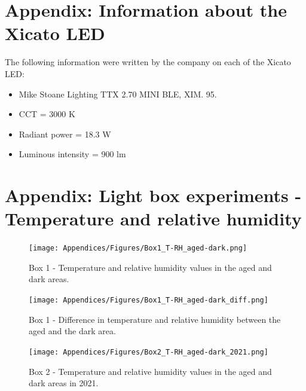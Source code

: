 \begin{appendices}
  
\renewcommand{\thesection}{4.\arabic{section}}



\newpage
\section[\hspace{0.3cm}Information about the Xicato LED]{ Appendix: Information about the Xicato LED}
\label{app:ch4_xicato_LED}

The following information were written by the company on each of the Xicato LED:
\begin{itemize}
\item Mike Stoane Lighting TTX 2.70 MINI BLE,  XIM. 95. 
\item CCT = 3000 K 
\item Radiant power = 18.3 W
\item Luminous intensity = 900 lm
\end{itemize}




\newpage
\section[\hspace{0.3cm}Light box experiments - Temperature and relative humidity]{ Appendix: Light box experiments - Temperature and relative humidity}
\label{app:ch4_boxes_T-RH}

\begin{figure}[!h]
\centering
\texttt{[image: Appendices/Figures/Box1\_T-RH\_aged-dark.png]}
\caption*{Box 1 - Temperature and relative humidity values in the aged and dark areas.}
\label{fig:box1_T-RH_aged-dark}
\end{figure}

\begin{figure}[!h]
\centering
\texttt{[image: Appendices/Figures/Box1\_T-RH\_aged-dark\_diff.png]}
\caption*{Box 1 - Difference in temperature and relative humidity between the aged and the dark area.}
\label{fig:box1_T-RH_aged-dark_diff}
\end{figure}


\begin{figure}[!h]
\centering
\texttt{[image: Appendices/Figures/Box2\_T-RH\_aged-dark\_2021.png]}
\caption*{Box 2 - Temperature and relative humidity values in the aged and dark areas in 2021.}
\label{fig:box2-2021_T-RH_aged-dark}
\end{figure}





\end{appendices}
